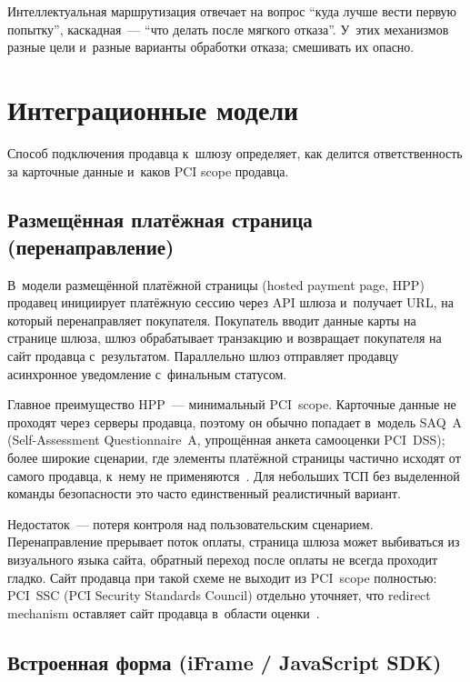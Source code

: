 
Интеллектуальная маршрутизация отвечает на вопрос \enquote{куда лучше
вести первую попытку}, каскадная~--- \enquote{что делать после мягкого
отказа}. У~этих механизмов разные цели и~разные варианты обработки отказа;
смешивать их опасно.

\section{Интеграционные модели}\label{sec:gw-integration}

Способ подключения продавца к~шлюзу определяет, как
делится ответственность за карточные данные и~каков
PCI scope продавца.

\subsection*{Размещённая платёжная страница (перенаправление)}

В~модели размещённой платёжной страницы (hosted payment page, HPP)
продавец инициирует платёжную сессию через API шлюза
и~получает URL, на который перенаправляет покупателя. Покупатель
вводит данные карты на странице шлюза, шлюз обрабатывает транзакцию
и возвращает покупателя на сайт продавца с~результатом. Параллельно
шлюз отправляет продавцу асинхронное уведомление с~финальным
статусом.

Главное преимущество HPP~--- минимальный PCI~scope. Карточные
данные не проходят через серверы продавца, поэтому
он обычно попадает в~модель SAQ~A (Self-Assessment Questionnaire~A,
упрощённая анкета самооценки PCI~DSS); более широкие сценарии,
где элементы платёжной страницы частично исходят от самого
продавца, к~нему не применяются~\cite{pci-faq-1291,pci-faq-1293}. Для небольших
ТСП без выделенной команды безопасности это часто
единственный реалистичный вариант.

Недостаток~--- потеря контроля над пользовательским сценарием.
Перенаправление прерывает поток оплаты, страница шлюза может
выбиваться из визуального языка сайта, обратный переход
после оплаты не всегда проходит гладко. Сайт продавца при такой
схеме не выходит из PCI~scope полностью: PCI~SSC (PCI Security
Standards Council) отдельно уточняет, что redirect mechanism
оставляет сайт продавца в~области оценки~\cite{pci-faq-1332}.

\subsection*{Встроенная форма (iFrame / JavaScript SDK)}

